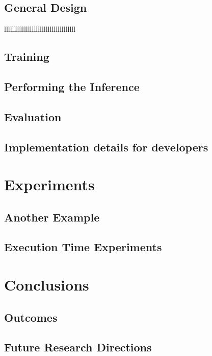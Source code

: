 \documentclass[11pt,twoside]{article}
\numberwithin{Theorem}{section}
\numberwithin{Definition}{section}
\numberwithin{Lemma}{section}
\numberwithin{Algorithm}{section}
\numberwithin{equation}{section}
\begin{document}
\subsection{General Design}
\label{subsec:general_design}
% 

llllllllllllllllllllllllllllllllllll
\subsection{Training}
\label{subsec:training}


\subsection{Performing the Inference}
\label{subsec:inference}


\subsection{Evaluation}
\label{subsec:evaluation}


\subsection{Implementation details for developers}
\label{subsec:developers}

\clearpage
\section{Experiments}

\subsection{Another Example}

\subsection{Execution Time Experiments}

\section{Conclusions}

\subsection{Outcomes}

\subsection{Future Research Directions}
\clearpage
\end{document}
